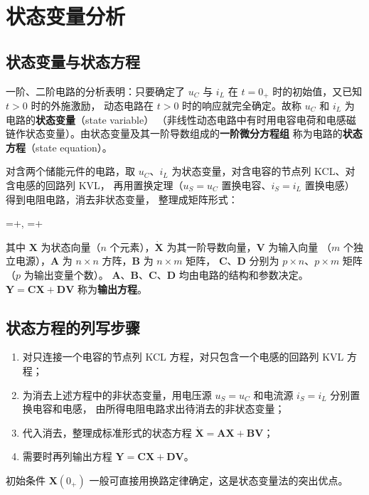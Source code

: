 \section{状态变量分析}

\subsection{状态变量与状态方程}
一阶、二阶电路的分析表明：只要确定了 $u_C$ 与 $i_L$ 在 $t=0_+$ 时的初始值，又已知 $t>0$ 时的外施激励，
动态电路在 $t>0$ 时的响应就完全确定。故称 $u_C$ 和 $i_L$ 为电路的\textbf{状态变量}（state variable）
（非线性动态电路中有时用电容电荷和电感磁链作状态变量）。由状态变量及其一阶导数组成的\textbf{一阶微分方程组}
称为电路的\textbf{状态方程}（state equation）。

对含两个储能元件的电路，取 $u_C$、$i_L$ 为状态变量，对含电容的节点列 KCL、对含电感的回路列 KVL，
再用置换定理（$u_S=u_C$ 置换电容、$i_S=i_L$ 置换电感）得到电阻电路，消去非状态变量，
整理成矩阵形式：
\begin{keyformula}{=+,
  \qquad {}=+}
\end{keyformula}
其中 $\boldsymbol{X}$ 为状态向量（$n$ 个元素），$\dot{\boldsymbol{X}}$ 为其一阶导数向量，$\boldsymbol{V}$ 为输入向量
（$m$ 个独立电源），$\boldsymbol{A}$ 为 $n\times n$ 方阵，$\boldsymbol{B}$ 为 $n\times m$ 矩阵，
$\boldsymbol{C}$、$\boldsymbol{D}$ 分别为 $p\times n$、$p\times m$ 矩阵（$p$ 为输出变量个数）。
$\boldsymbol{A}$、$\boldsymbol{B}$、$\boldsymbol{C}$、$\boldsymbol{D}$ 均由电路的结构和参数决定。
$\boldsymbol{Y}=\boldsymbol{C}\boldsymbol{X}+\boldsymbol{D}\boldsymbol{V}$ 称为\textbf{输出方程}。

\subsection{状态方程的列写步骤}
\begin{enumerate}
  \item 对只连接一个电容的节点列 KCL 方程，对只包含一个电感的回路列 KVL 方程；
  \item 为消去上述方程中的非状态变量，用电压源 $u_S=u_C$ 和电流源 $i_S=i_L$ 分别置换电容和电感，
        由所得电阻电路求出待消去的非状态变量；
  \item 代入消去，整理成标准形式的状​态方程 $\dot{\boldsymbol{X}}=\boldsymbol{A}\boldsymbol{X}+\boldsymbol{B}\boldsymbol{V}$；
  \item 需要时再列输出方程 $\boldsymbol{Y}=\boldsymbol{C}\boldsymbol{X}+\boldsymbol{D}\boldsymbol{V}$。
\end{enumerate}
初始条件 $\boldsymbol{X}(0_+)$ 一般可直接用换路定律确定，这是状态变量法的突出优点。

